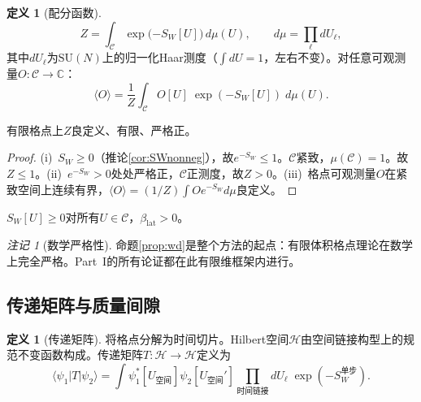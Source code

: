 \documentclass[12pt,a4paper]{article}
\theoremstyle{plain}
\theoremstyle{definition}\newtheorem{definition}[theorem]{定义}
\theoremstyle{remark}\newtheorem{remark}[theorem]{注记}
\begin{document}
\begin{definition}[配分函数]\label{def:Z}
\begin{equation}\label{eq:Z}
Z = \int_{\mathcal{C}} \exp\!\bigl({-S_W[U]}\bigr)\,d\mu(U), \qquad d\mu = \prod_\ell dU_\ell,
\end{equation}
其中$dU_\ell$为$\mathrm{SU}(N)$上的归一化Haar测度（$\int dU=1$，左右不变）。对任意可观测量$O:\mathcal{C}\to\mathbb{C}$：
\begin{equation}
\langle O \rangle = \frac{1}{Z}\int_{\mathcal{C}} O[U]\;\exp({-S_W[U]})\;d\mu(U).
\end{equation}
\end{definition}

\begin{proposition}[良定义性]\label{prop:wd}
有限格点上$Z$良定义、有限、严格正。
\end{proposition}

\begin{proof}
(i)~$S_W\geq 0$（推论\ref{cor:SWnonneg}），故$e^{-S_W}\leq 1$。$\mathcal{C}$紧致，$\mu(\mathcal{C})=1$。故$Z\leq 1$。(ii)~$e^{-S_W}>0$处处严格正，$\mathcal{C}$正测度，故$Z>0$。(iii)~格点可观测量$O$在紧致空间上连续有界，$\langle O\rangle=(1/Z)\int Oe^{-S_W}d\mu$良定义。
\end{proof}

\begin{corollary}[Wilson作用量非负]\label{cor:SWnonneg}
$S_W[U]\geq 0$对所有$U\in\mathcal{C}$，$\beta_{\mathrm{lat}}>0$。
\end{corollary}

\begin{remark}[数学严格性]
命题\ref{prop:wd}是整个方法的起点：有限体积格点理论在数学上完全严格。Part~I的所有论证都在此有限维框架内进行。
\end{remark}

\subsection{传递矩阵与质量间隙}\label{sec:transfer}

\begin{definition}[传递矩阵]\label{def:transfer}
将格点分解为时间切片。Hilbert空间$\mathcal{H}$由空间链接构型上的规范不变函数构成。传递矩阵$T:\mathcal{H}\to\mathcal{H}$定义为
\begin{equation}
\langle\psi_1|T|\psi_2\rangle = \int \psi_1^*[U_{\text{空间}}]\psi_2[U_{\text{空间}}']\prod_{\text{时间链接}}dU_\ell\;\exp(-S_W^{\text{单步}}).
\end{equation}
\end{definition}
\end{document}

